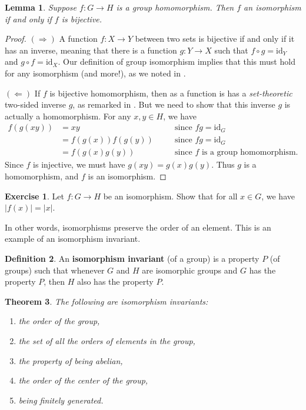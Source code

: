 \documentclass[12pt]{report}
\newtheorem{theorem}{Theorem}[chapter]
\newtheorem{lemma}[theorem]{Lemma}
\numberwithin{equation}{section}
\numberwithin{theorem}{chapter}
\theoremstyle{definition}
\newtheorem{definition}[theorem]{Definition}
\newtheorem{exercise}{Exercise}
\newtheorem*{basic properties}{Basic Properties}
\newtheorem*{Important Remark}{Important Remark}
\newcommand{\df}[1]{{\bf #1}\index{#1}}
\begin{document}
\newpage

\begin{lemma}\label{iso def}
 Suppose $f\!: G \to H$ is a group homomorphism. Then $f$ an isomorphism if and only if $f$ is bijective.
\end{lemma}

\begin{proof} 
$(\Rightarrow)$ A function $f: X \to Y$ between two sets is bijective if and only if it has an inverse, meaning that there is a function $g: Y \to X$ such that $f \circ g = \mathrm{id}_Y$ and $g \circ f = \mathrm{id}_X$. Our definition of group isomorphism implies that this must hold for any isomorphism (and more!), as we noted in .

$(\Leftarrow)$ If $f$ is bijective homomorphism, then as a function is has a {\em set-theoretic} two-sided inverse $g$, as remarked in . But we need to show that this inverse $g$ is actually a homomorphism. For any $x,y \in H$, we have 
$$\begin{aligned}
f(g(xy)) & = xy \quad && \textrm{since } fg=\mathrm{id}_G \\
& = f(g(x))f(g(y)) \quad && \textrm{since } fg=\mathrm{id}_G\\
& = f(g(x)g(y)) \quad && \textrm{since $f$ is a group homomorphism} .
\end{aligned}$$ 
 Since $f$ is injective, we must have $g(xy) = g(x)g(y)$. Thus $g$ is a homomorphism, and $f$ is an isomorphism.
\end{proof}


\begin{exercise}\label{isos preserve order}
	Let $f\!: G \to H$ be an isomorphism. Show that for all $x \in G$, we have $|f(x)| = |x|$.
\end{exercise}

In other words, isomorphisms preserve the order of an element. This is an example of an isomorphism invariant.


\begin{definition}\label{def:isoinvariant}
An \df{isomorphism invariant} (of a group) is a property $P$ (of groups) such that whenever $G$ and $H$ are isomorphic groups and $G$ has the property $P$, then $H$ also has the property $P$.
 \end{definition}


\begin{theorem}\label{isoinvariants}
The following are isomorphism invariants:
\begin{enumerate}[leftmargin=20pt,label=(\alph*)]
\item the order of the group,
\item the set of all the orders of elements in the group,
\item the property of being abelian,
\item the order of the center of the group,
\item being finitely generated.
\end{enumerate}
\end{theorem}
\end{document}
